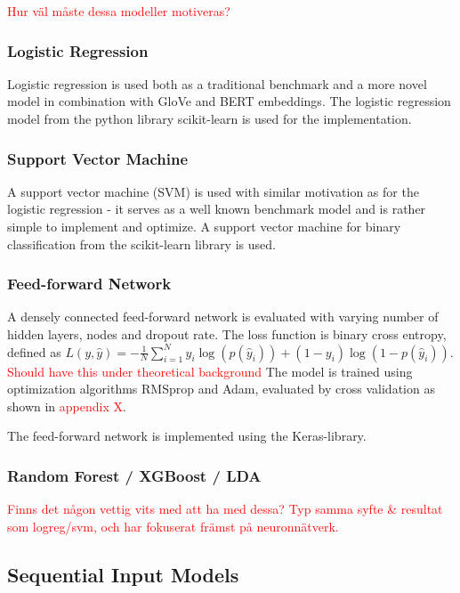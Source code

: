 \textcolor{red}{Hur väl måste dessa modeller motiveras?}

\subsubsection*{Logistic Regression}

Logistic regression is used both as a traditional benchmark and a more novel model in combination with GloVe and BERT embeddings. The logistic regression model from the python library scikit-learn is used for the implementation.

\subsubsection*{Support Vector Machine}

A support vector machine (SVM) is used with similar motivation as for the logistic regression - it serves as a well known benchmark model and is rather simple to implement and optimize.  A support vector machine for binary classification from the scikit-learn library is used. 

\subsubsection*{Feed-forward Network}

A densely connected feed-forward network is evaluated with varying number of hidden layers, nodes and dropout rate. The loss function is binary cross entropy, defined as $L(y,\hat{y}) = -\frac{1}{N} \sum_{i=1}^N y_i \log{(p(\hat{y}_i))} + (1 - y_i) \log{(1 - p(\hat{y}_i))}$. \textcolor{red}{Should have this under theoretical background} The model is trained using optimization algorithms RMSprop and Adam, evaluated by cross validation as shown in \textcolor{red}{appendix X}.



The feed-forward network is implemented using the Keras-library. 


\subsubsection*{Random Forest / XGBoost / LDA}
\textcolor{red}{Finns det någon vettig vits med att ha med dessa? Typ samma syfte \& resultat som logreg/svm, och har fokuserat främst på neuronnätverk. }


\subsection{Sequential Input Models}

